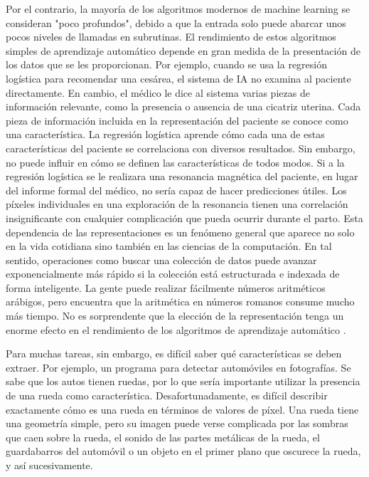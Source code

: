 	
	Por el contrario, la mayoría de los algoritmos modernos de machine learning se consideran "poco profundos", debido a que la entrada solo puede abarcar unos pocos niveles de llamadas en subrutinas. El rendimiento de estos algoritmos simples de aprendizaje automático depende en gran medida de la presentación de los datos que se les proporcionan. Por ejemplo, cuando se usa la regresión logística para recomendar una cesárea, el sistema de IA no examina al paciente directamente. En cambio, el médico le dice al sistema varias piezas de información relevante, como la presencia o ausencia de una cicatriz uterina. Cada pieza de información incluida en la representación del paciente se conoce como una característica. La regresión logística aprende cómo cada una de estas características del paciente se correlaciona con diversos resultados. Sin embargo, no puede influir en cómo se definen las características de todos modos. Si a la regresión logística se le realizara una resonancia magnética del paciente, en lugar del informe formal del médico, no sería capaz de hacer predicciones útiles. Los píxeles individuales en una exploración de la resonancia tienen una correlación insignificante con cualquier complicación que pueda ocurrir durante el parto. Esta dependencia de las representaciones es un fenómeno general que aparece no solo en la vida cotidiana sino también en las ciencias de la computación. En tal sentido, operaciones como buscar una colección de datos puede avanzar exponencialmente más rápido si la colección está estructurada e indexada de forma inteligente. La gente puede realizar fácilmente números aritméticos arábigos, pero encuentra que la aritmética en números romanos consume mucho más tiempo. No es sorprendente que la elección de la representación tenga un enorme efecto en el rendimiento de los algoritmos de aprendizaje automático \citep{Goodfellow-et-al-2016}.

	
	Para muchas tareas, sin embargo, es difícil saber qué características se deben extraer. Por ejemplo, un programa para detectar automóviles en fotografías. Se sabe que los autos tienen ruedas, por lo que sería importante utilizar la presencia de una rueda como característica. Desafortunadamente, es difícil describir exactamente cómo es una rueda en términos de valores de píxel. Una rueda tiene una geometría simple, pero su imagen puede verse complicada por las sombras que caen sobre la rueda, el sonido de las partes metálicas de la rueda, el guardabarros del automóvil o un objeto en el primer plano que oscurece la rueda, y así sucesivamente. 


